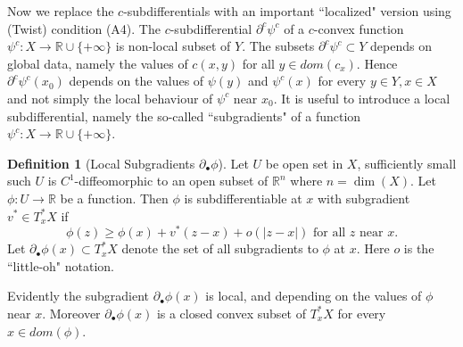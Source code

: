 \documentclass[12pt]{amsart}
\newtheorem{lem}{Lemma}
\theoremstyle{definition}
\newtheorem{dfn}{Definition}
\theoremstyle{remark}
\newcommand{\bR}{\mathbb{R}}
\newcommand{\del}{\partial}
\newcommand{\hh}{\hookleftarrow}
\begin{document}






Now we replace the $c$-subdifferentials with an important ``localized" version using (Twist) condition (A4). The $c$-subdifferential $\del^c \psi^c$ of a $c$-convex function $\psi^c : X\to \bR \cup \{+\infty\}$ is non-local subset of $Y$. The subsets $\del^c \psi^c \subset Y$ depends on global data, namely the values of $c(x,y)$ for all $y\in dom(c_{x})$. Hence $\del^c \psi^c (x_0)$ depends on the values of $\psi(y)$ and $\psi^c(x)$ for every $y\in Y, x\in X$ and not simply the local behaviour of $\psi^c $ near $x_0$. It is useful to introduce a local subdifferential, namely the so-called ``subgradients" of a function $\psi^c:X\to \bR \cup \{+\infty\}$. 


\begin{dfn}[Local Subgradients $\del_\bullet \phi$]
Let $U$ be open set in $X$, sufficiently small such $U$ is $C^1$-diffeomorphic to an open subset of $\bR^n$ where $n=\dim(X)$. Let $\phi: U \to \bR$ be a function. Then $\phi$ is subdifferentiable at $x$ with subgradient $v^*\in T_x^*X$ if $$\phi(z)\geq \phi(x) + v^*(z-x) + o(|z-x|) \text{~for all~} z \text{~near~}x.$$ Let $\del_\bullet \phi(x) \subset T_x^* X$ denote the set of all subgradients to $\phi$ at $x$. Here $o$ is the ``little-oh" notation.
\end{dfn} 
Evidently the subgradient $\del_\bullet \phi(x)$ is local, and depending on the values of $\phi$ near $x$. Moreover $\del_\bullet \phi(x)$ is a closed convex subset of $T_x^*X$ for every $x\in dom(\phi)$. %
\end{document}
